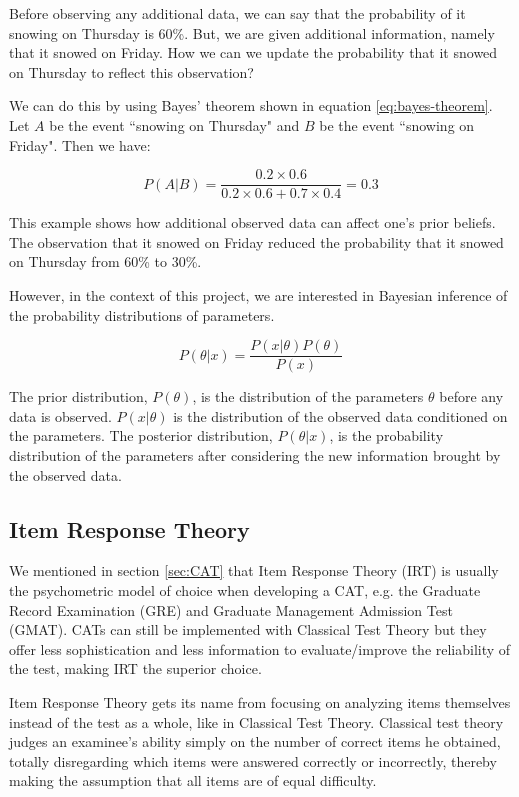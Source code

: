 Before observing any additional data, we can say that the probability of it snowing on Thursday is 60\%. But, we are given additional information, namely that it snowed on Friday. How we can we update the probability that it snowed on Thursday to reflect this observation? \newline

We can do this by using Bayes' theorem shown in equation \ref{eq:bayes-theorem}. Let $A$ be the event ``snowing on Thursday" and $B$ be the event ``snowing on Friday". Then we have:

$$P(A|B) = \dfrac{0.2 \times 0.6}{0.2 \times 0.6 + 0.7 \times 0.4} = 0.3$$

This example shows how additional observed data can affect one's prior beliefs. The observation that it snowed on Friday reduced the probability that it snowed on Thursday from 60\% to 30\%.
\newline

However, in the context of this project, we are interested in Bayesian inference of the probability distributions of parameters.

$$P(\theta|x) = \dfrac{P(x|\theta)P(\theta)}{P(x)}$$

The prior distribution, $P(\theta)$, is the distribution of the parameters $\theta$ before any data is observed. $P(x|\theta)$ is the distribution of the observed data conditioned on the parameters. The posterior distribution, $P(\theta|x)$, is the probability distribution of the parameters after considering the new information brought by the observed data.

\subsection{Item Response Theory}
\label{subsec:IRT}
We mentioned in section \ref{sec:CAT} that Item Response Theory (IRT) is usually the psychometric model of choice when developing a CAT, e.g. the Graduate Record Examination (GRE) and Graduate Management Admission Test (GMAT). CATs can still be implemented with Classical Test Theory but they offer less sophistication and less information to evaluate/improve the reliability of the test, making IRT the superior choice. \newline

Item Response Theory gets its name from focusing on analyzing items themselves instead of the test as a whole, like in Classical Test Theory. Classical test theory judges an examinee's ability simply on the number of correct items he obtained, totally disregarding which items were answered correctly or incorrectly, thereby making the assumption that all items are of equal difficulty.

